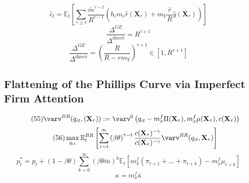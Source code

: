 \documentclass{beamer}
\begin{document}
\begin{frame}{\subsecname}
    \begin{equation}\tag{52}
        \hat{c}_{t}=\mathbb{E}_{t}\left[\sum_{\tau\geq t}\frac{\bar{m}^{\tau-t}}{R^{\tau-t}}\left(b_{r}m_{r}\hat{r}(\textbf{X}_{\tau})+m_{Y}\frac{\bar{r}}{R}\hat{y}(\textbf{X}_{\tau})\right)\right]
    \end{equation}
    \begin{equation}\tag{53}
        \frac{\Delta^{GE}}{\Delta^{\text{direct}}}=R^{\tau+1}
    \end{equation}
    \begin{equation}\tag{54}
        \frac{\Delta^{GE}}{\Delta^{\text{direct}}}=\left(\frac{R}{R-rm_{Y}}\right)^{\tau+1}\in\left[1, R^{\tau+1}\right]
    \end{equation}
\end{frame}


\subsection{Flattening of the Phillips Curve via Imperfect Firm Attention}
\begin{frame}{\subsecname}
    \begin{equation}\tag{55}
        \varv^{BR}(q_{it},(\textbf{X}_{\tau})):=\varv^{0}\left(q_{it}-m^{f}_{\pi}\Pi(\textbf{X}_{\tau}),m^{f}_{x}\mu(\textbf{X}_{\tau}),c(\textbf{X}_{\tau})\right)
    \end{equation}
    \begin{equation}\tag{56}
        \max_{q_{it}}{\mathbb{E}_{t}^{BR}\left[\sum_{\tau=t}^{\infty}\left(\beta\theta\right)^{\tau-t}\frac{c(\textbf{X}_{\tau})^{-\gamma}}{c(\textbf{X}_{\tau})^{-\gamma}}\varv^{BR}(q_{it},\textbf{X}_{\tau})\right]}
    \end{equation}
    \begin{equation}\tag{57}
        p^{*}_{t}=p_{t}+(1-\beta\theta)\sum^{\infty}_{k=0} \left(\beta\theta\bar{m}\right)^{k}\mathbb{E}_{t}\left[m^{f}_{\pi}(\pi_{t+1}+...+\pi_{t+k})-m^{f}_{x}\mu_{t+k}\right]
    \end{equation}
    \begin{equation}\tag{58}
        \kappa = m^{f}_{x}\bar{\kappa}
    \end{equation}
\end{frame}
\end{document}
